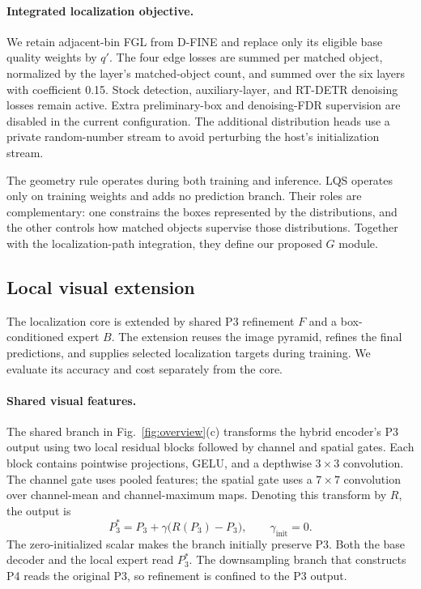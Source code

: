 \paragraph{Integrated localization objective.}
We retain adjacent-bin FGL from D-FINE and replace only its eligible base quality weights by $q'$. The four edge losses are summed per matched object, normalized by the layer's matched-object count, and summed over the six layers with coefficient 0.15. Stock detection, auxiliary-layer, and RT-DETR denoising losses remain active. Extra preliminary-box and denoising-FDR supervision are disabled in the current configuration. The additional distribution heads use a private random-number stream to avoid perturbing the host's initialization stream.

The geometry rule operates during both training and inference. LQS operates only on training weights and adds no prediction branch. Their roles are complementary: one constrains the boxes represented by the distributions, and the other controls how matched objects supervise those distributions. Together with the localization-path integration, they define our proposed $G$ module.

\subsection{Local visual extension}
\label{sec:extension}
The localization core is extended by shared P3 refinement $F$ and a box-conditioned expert $B$. The extension reuses the image pyramid, refines the final predictions, and supplies selected localization targets during training. We evaluate its accuracy and cost separately from the core.

\paragraph{Shared visual features.}
The shared branch in Fig.~\ref{fig:overview}(c) transforms the hybrid encoder's P3 output using two local residual blocks followed by channel and spatial gates. Each block contains pointwise projections, GELU, and a depthwise $3\times3$ convolution. The channel gate uses pooled features; the spatial gate uses a $7\times7$ convolution over channel-mean and channel-maximum maps. Denoting this transform by $R$, the output is
\begin{equation}
P_3^{*}=P_3+\gamma\bigl(R(P_3)-P_3\bigr),\qquad
\gamma_{\mathrm{init}}=0.
\label{eq:shared}
\end{equation}
The zero-initialized scalar makes the branch initially preserve P3. Both the base decoder and the local expert read $P_3^{*}$. The downsampling branch that constructs P4 reads the original P3, so refinement is confined to the P3 output.

